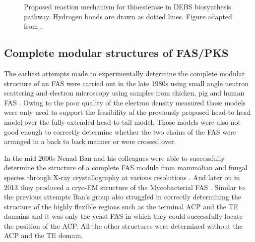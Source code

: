 			\setlength\fboxsep{5pt}
 			\setlength\fboxrule{1.5pt}
			\begin{figure} []
			\centering
			\caption[Proposed reaction mechanism for thioesterase]{Proposed reaction mechanism for thioesterase in DEBS biosynthesis pathway. Hydrogen bonds are drawn as dotted lines. Figure adapted from \parencite{Tsai2001}.}
			\label{fig:TEreact}
			\end{figure}			
\newpage						
		\subsection{Complete modular structures of FAS/PKS}
		\label{sec:PKSstructure}
		The earliest attempts made to experimentally determine the complete modular structure of an FAS  were carried out in the late 1980s using small angle neutron scattering and electron microscopy using samples from chicken, pig and human FAS \parencite{Stoops1987, Kitamoto1988, Brink2002}. Owing to the poor quality of the electron density measured those models were only used to support the feasibility of the previously proposed head-to-head model over the fully extended head-to-tail model. Those models were also not good enough to correctly determine whether the two chains of the FAS were arranged in a back to back manner or were crossed over. 
		
		In the mid 2000s Nenad Ban and his colleagues were able to successfully determine the structure of a complete FAS module from mammalian and fungal species through X-ray crystallography at various resolutions \parencite{Maier2006, Jenni2007, Maier2008}. And later on in 2013 they produced a cryo-EM structure of the Mycobacterial FAS \parencite{Boehringer2013}. Similar to the previous attempts Ban's group also struggled in correctly determining the structure of the highly flexible regions such as the terminal ACP and the TE domains and it was only the yeast FAS in which they could successfully locate the position of the ACP. All the other structures were determined without the ACP and the TE domain.
		
